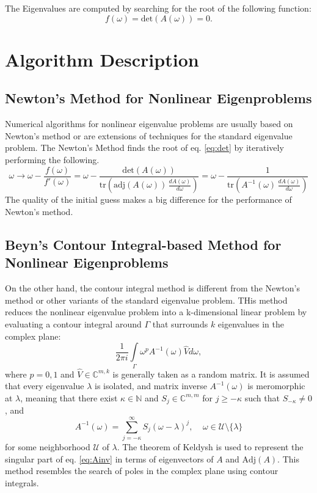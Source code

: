 \documentclass[11pt,letterpaper]{article}
\begin{document}
\begin{multicols}{2}
The Eigenvalues are computed by searching for the root of the following function:
\begin{equation}\label{eq:det}
f(\omega)=\text{det}\left(A(\omega)\right) = 0.
\end{equation}  

\section{Algorithm Description}
\subsection*{Newton's Method for Nonlinear Eigenproblems}
Numerical algorithms for nonlinear eigenvalue problems are usually based on Newton's method or are extensions of techniques for the standard eigenvalue problem. The Newton's Method finds the root of eq. \ref{eq:det} by iteratively performing the following.
\begin{equation}
\omega \rightarrow \omega - \frac{f(\omega)}{f'(\omega)} = \omega - \frac{\mathrm{det}(A(\omega))}{ \mathrm{tr} \left( \mathrm{adj}(A(\omega))\,\frac{dA(\omega)}{d\omega} \right)}
= \omega - \frac{1}{ \mathrm{tr} \left( A^{-1}(\omega)\,\frac{dA(\omega)}{d\omega} \right)}
\end{equation}
The quality of the initial guess makes a big difference for the performance of Newton's method. 
\subsection*{Beyn's Contour Integral-based Method for Nonlinear Eigenproblems}
On the other hand, the contour integral method is different from the Newton's method or other variants of the standard eigenvalue problem. THis method reduces the nonlinear eigenvalue problem into a k-dimensional linear problem by evaluating a contour integral around $\Gamma$ that surrounds $k$ eigenvalues in the complex plane:
\begin{equation}\label{eq:cont}
\frac{1}{2\pi i}\int\limits_{\Gamma}\omega^p A^{-1}(\omega)\hat{V}d\omega,
\end{equation}
where $p=0,1$ and $\hat{V} \in \mathbb{C}^{m,k}$ is generally taken as a random matrix. It is assumed that every eigenvalue $\lambda$ is isolated, and matrix inverse $A^{-1}(\omega)$ is meromorphic at $\lambda$, meaning that there exist $\kappa\in\mathbb{N}$ and $S_j\in \mathbb{C}^{m,m}$ for $j\geq -\kappa$ such that $S_{-\kappa}\neq 0$, and 
\begin{equation}\label{eq:Ainv}
A^{-1}(\omega)=\sum\limits_{j=-\kappa}^{\infty} S_j (\omega-\lambda)^j,\;\;
\;\; \omega \in \mathcal{U} \setminus \lbrace\lambda\rbrace 
\end{equation}
for some neighborhood $\mathcal{U}$ of $\lambda$. The theorem of Keldysh\citep{keldysh1951characteristic} is used to represent the singular part of eq. \ref{eq:Ainv} in terms of eigenvectors of $A$ and $\mathrm{Adj}(A)$. This method resembles the search of poles in the complex plane using contour integrals. 


\end{multicols}
\end{document}
